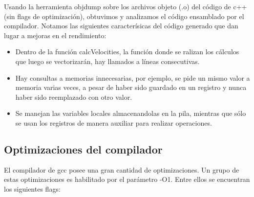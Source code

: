 Usando la herramienta objdump sobre los archivos objeto (.o) del código de c++ (sin flags de optimización), obtuvimos y analizamos el código ensamblado por el compilador. Notamos las siguientes caracterísicas del código generado que dan lugar a mejoras en el rendimiento:
\begin{itemize}
	\item Dentro de la función calcVelocities, la función donde se ralizan los cálculos que luego se vectorizarán, hay llamados a líneas consecutivas.
	\item Hay consultas a memorias innecesarias, por ejemplo, se pide un mismo valor a memoria varias veces, a pesar de haber sido guardado en un registro y nunca haber sido reemplazado con otro valor.
	\item Se manejan las variables locales almacenandolas en la pila, mientras que sólo se usan los registros de manera auxiliar para realizar operaciones.
\end{itemize}


\subsection{Optimizaciones del compilador}

El compilador de gcc posee una gran cantidad de optimizaciones. Un grupo de estas optimizaciones es habilitado por el parámetro -O1. Entre ellos se encuentran los siguientes flags:



    

            

